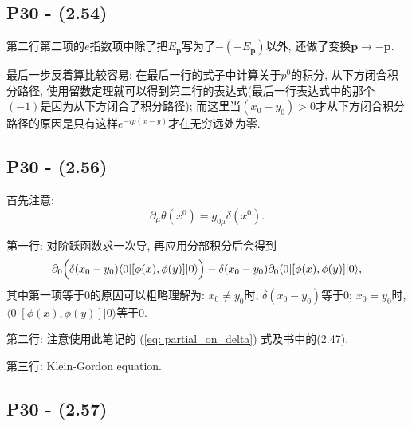 \documentclass[10pt,b5paper,openany]{book}
\begin{document}
\begin{center}
\end{center}

\subsection{P30 - (2.54)}

第二行第二项的$e$指数项中除了把$E_\mathbf{p}$写为了$-(-E_\mathbf{p})$以外, 还做了变换$\mathbf{p} \rightarrow -\mathbf{p}$. 

最后一步反着算比较容易: 在最后一行的式子中计算关于$p^0$的积分, 从下方闭合积分路径, 使用留数定理就可以得到第二行的表达式(最后一行表达式中的那个$(-1)$是因为从下方闭合了积分路径); 而这里当$(x_0 - y_0)>0$才从下方闭合积分路径的原因是只有这样$e^{-ip(x - y)}$才在无穷远处为零. 

\subsection{P30 - (2.56)}

首先注意: 
\begin{equation}
  \partial_\mu \theta(x^0) = g_{0\mu} \delta(x^0) \label{eq: partial_on_delta}.
\end{equation}

第一行: 对阶跃函数求一次导, 再应用分部积分后会得到
\begin{equation}
  \partial_0 \Bigl(\delta(x_0 - y_0)\langle 0|[\phi(x), \phi(y)]|0\rangle \Bigr)-\delta(x_0 - y_0)\partial_0\langle 0|[\phi(x), \phi(y)]|0\rangle,
\end{equation}
其中第一项等于0的原因可以粗略理解为: $x_0 \neq y_0$时, $\delta(x_0 - y_0)$等于0; $x_0 = y_0$时, $\langle 0|[\phi(x), \phi(y)]|0\rangle$等于0. 

第二行: 注意使用此笔记的 (\ref{eq: partial_on_delta}) 式及书中的(2.47). 

第三行: Klein-Gordon equation. 

\subsection{P30 - (2.57)}
\end{document}
